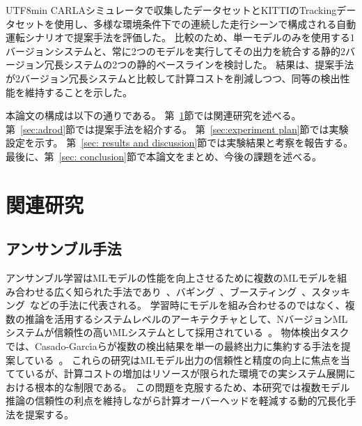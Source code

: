 \documentclass[conference, dvipdfmx]{IEEEtran}
\begin{document}
\begin{CJK}{UTF8}{min}
CARLAシミュレータで収集したデータセットとKITTIのTrackingデータセットを使用し、多様な環境条件下での連続した走行シーンで構成される自動運転シナリオで提案手法を評価した。
比較のため、単一モデルのみを使用する1バージョンシステムと、常に2つのモデルを実行してその出力を統合する静的2バージョン冗長システムの2つの静的ベースラインを検討した。
結果は、提案手法が2バージョン冗長システムと比較して計算コストを削減しつつ、同等の検出性能を維持することを示した。



本論文の構成は以下の通りである。
第~\ref{sec:related work}節では関連研究を述べる。
第~\ref{sec:adrod}節では提案手法を紹介する。
第~\ref{sec:experiment plan}節では実験設定を示す。
第~\ref{sec: results and discussion}節では実験結果と考察を報告する。
最後に、第~\ref{sec: conclusion}節で本論文をまとめ、今後の課題を述べる。

\section{関連研究}
\label{sec:related work}

\subsection{アンサンブル手法}
アンサンブル学習はMLモデルの性能を向上させるために複数のMLモデルを組み合わせる広く知られた手法であり~\cite{EnsembleSurvey2022}、バギング~\cite{Breiman1996}、ブースティング~\cite{Freund1997, Freund1996}、スタッキング~\cite{Wolpert1992}などの手法に代表される。
学習時にモデルを組み合わせるのではなく、複数の推論を活用するシステムレベルのアーキテクチャとして、NバージョンMLシステムが信頼性の高いMLシステムとして採用されている~\cite{machida_diversities_of_2version, Machida2019}。
物体検出タスクでは、Casado-Garc{\'\i}aらが複数の検出結果を単一の最終出力に集約する手法を提案している~\cite{CasadoGarcia2020}。
これらの研究はMLモデル出力の信頼性と精度の向上に焦点を当てているが、計算コストの増加はリソースが限られた環境での実システム展開における根本的な制限である。
この問題を克服するため、本研究では複数モデル推論の信頼性の利点を維持しながら計算オーバーヘッドを軽減する動的冗長化手法を提案する。


\end{CJK}
\end{document}
